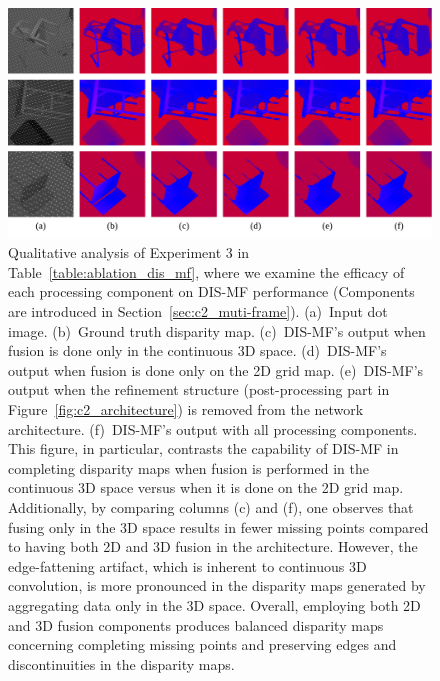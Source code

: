 \begin{figure}[t]
    \begin{center}
        \includegraphics[width=1.0\linewidth]{images/chapter2/supp_figures/ablation_mf_2d3d.jpg}
    \end{center}
   \caption{Qualitative analysis of Experiment 3 in Table~\ref{table:ablation_dis_mf}, where we examine the efficacy of each processing component on DIS-MF performance (Components are introduced in Section~\ref{sec:c2_muti-frame}). (a)~Input dot image. (b)~Ground truth disparity map. (c)~DIS-MF's output when fusion is done only in the continuous 3D space. (d)~DIS-MF's output when fusion is done only on the 2D grid map. (e)~DIS-MF's output when the refinement structure (post-processing part in Figure~\ref{fig:c2_architecture}) is removed from the network architecture. (f)~DIS-MF's output with all processing components. This figure, in particular, contrasts the capability of DIS-MF in completing disparity maps when fusion is performed in the continuous 3D space versus when it is done on the 2D grid map. Additionally, by comparing columns (c) and (f), one observes that fusing only in the 3D space results in fewer missing points compared to having both 2D and 3D fusion in the architecture. However, the edge-fattening artifact, which is inherent to continuous 3D convolution, is more pronounced in the disparity maps generated by aggregating data only in the 3D space. Overall, employing both 2D and 3D fusion components produces balanced disparity maps concerning completing missing points and preserving edges and discontinuities in the disparity maps.}
    \label{fig:c2_ablation_mf_2d3d}
\end{figure}

